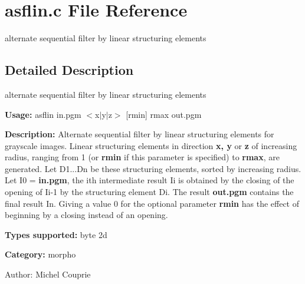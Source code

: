 \section{asflin.c File Reference}
\label{asflin_8c}
alternate sequential filter by linear structuring elements  




\label{_details}
\subsection{Detailed Description}
alternate sequential filter by linear structuring elements 

{\bf Usage:} asflin in.pgm $<$x$|$y$|$z$>$ [rmin] rmax out.pgm

{\bf Description:} Alternate sequential filter by linear structuring elements for grayscale images. Linear structuring elements in direction {\bf x, y} or {\bf z} of increasing radius, ranging from 1 (or {\bf rmin} if this parameter is specified) to {\bf rmax}, are generated. Let D1...Dn be these structuring elements, sorted by increasing radius. Let I0 = {\bf in.pgm}, the ith intermediate result Ii is obtained by the closing of the opening of Ii-1 by the structuring element Di. The result {\bf out.pgm} contains the final result In. Giving a value 0 for the optional parameter {\bf rmin} has the effect of beginning by a closing instead of an opening.

{\bf Types supported:} byte 2d

{\bf Category:} morpho

\begin{Desc}
\item[Author:]Michel Couprie \end{Desc}
